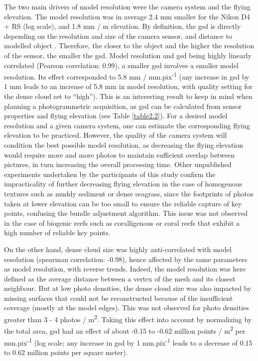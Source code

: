 The two main drivers of model resolution were the camera system and the flying elevation. The model resolution was in average 2.4 mm smaller for the Nikon D4 + RS (log scale), and 1.8 mm / m elevation. By definition, the \acrshort{gsd} is directly depending on the resolution and size of the camera sensor, and distance to modelled object \citep{forstner_photogrammetric_2016}. Therefore, the closer to the object and the higher the resolution of the sensor, the smaller the \acrshort{gsd}. Model resolution and \acrshort{gsd} being highly linearly correlated (Pearson correlation: 0.99), a smaller \acrshort{gsd} involves a smaller model resolution. Its effect corresponded to 5.8 mm / mm.pix\textsuperscript{-1} (any increase in \acrshort{gsd} by 1 mm leads to an increase of 5.8 mm in model resolution, with quality setting for the dense cloud set to “high”). This is an interesting result to keep in mind when planning a photogrammetric acquisition, as \acrshort{gsd} can be calculated from sensor properties and flying elevation (see Table \ref{table2.2}). For a desired model resolution and a given camera system, one can estimate the corresponding flying elevation to be practiced. However, the quality of the camera system will condition the best possible model resolution, as decreasing the flying elevation would require more and more photos to maintain sufficient overlap between pictures, in turn increasing the overall processing time. Other unpublished experiments undertaken by the participants of this study confirm the impracticality of further decreasing flying elevation in the case of homogenous textures such as muddy sediment or dense seagrass, since the footprints of photos taken at lower elevation can be too small to ensure the reliable capture of key points, confusing the bundle adjustment algorithm. This issue was not observed in the case of biogenic reefs such as coralligenous or coral reefs that exhibit a high number of reliable key points.

On the other hand, dense cloud size was highly anti-correlated with model resolution (spearman correlation: -0.98), hence affected by the same parameters as model resolution, with reverse trends. Indeed, the model resolution was here defined as the average distance between a vertex of the mesh and its closest neighbour. But at low photo densities, the dense cloud size was also impacted by missing surfaces that could not be reconstructed because of the insufficient coverage (mostly at the model edges). This was not observed for photo densities greater than 3 - 4 photos / m\textsuperscript{2}. Taking this effect into account by normalizing by the total area, \acrshort{gsd} had an effect of about -0.15 to -0.62 million points / m\textsuperscript{2} per mm.pix\textsuperscript{-1} (log scale; any increase in \acrshort{gsd} by 1 mm.pix\textsuperscript{-1} leads to a decrease of 0.15 to 0.62 million points per square meter).

